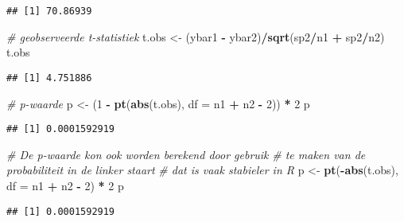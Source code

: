 \documentclass[12pt,dutch,coursenotes]{book}
\newenvironment{Shaded}{\begin{snugshade}}{\end{snugshade}}
\newcommand{\KeywordTok}[1]{\textcolor[rgb]{0.13,0.29,0.53}{\textbf{#1}}}
\newcommand{\DataTypeTok}[1]{\textcolor[rgb]{0.13,0.29,0.53}{#1}}
\newcommand{\DecValTok}[1]{\textcolor[rgb]{0.00,0.00,0.81}{#1}}
\newcommand{\StringTok}[1]{\textcolor[rgb]{0.31,0.60,0.02}{#1}}
\newcommand{\CommentTok}[1]{\textcolor[rgb]{0.56,0.35,0.01}{\textit{#1}}}
\newcommand{\OperatorTok}[1]{\textcolor[rgb]{0.81,0.36,0.00}{\textbf{#1}}}
\newcommand{\NormalTok}[1]{#1}
\theoremstyle{definition}
\theoremstyle{definition}
\theoremstyle{definition}
\theoremstyle{remark}
\begin{document}
\begin{verbatim}
## [1] 70.86939
\end{verbatim}

\begin{Shaded}
\begin{Highlighting}[]
\CommentTok{# geobserveerde t-statistiek}
\NormalTok{t.obs <-}\StringTok{ }\NormalTok{(ybar1 }\OperatorTok{-}\StringTok{ }\NormalTok{ybar2)}\OperatorTok{/}\KeywordTok{sqrt}\NormalTok{(sp2}\OperatorTok{/}\NormalTok{n1 }\OperatorTok{+}\StringTok{ }\NormalTok{sp2}\OperatorTok{/}\NormalTok{n2)}
\NormalTok{t.obs}
\end{Highlighting}
\end{Shaded}

\begin{verbatim}
## [1] 4.751886
\end{verbatim}

\begin{Shaded}
\begin{Highlighting}[]
\CommentTok{# p-waarde}
\NormalTok{p <-}\StringTok{ }\NormalTok{(}\DecValTok{1} \OperatorTok{-}\StringTok{ }\KeywordTok{pt}\NormalTok{(}\KeywordTok{abs}\NormalTok{(t.obs), }\DataTypeTok{df =}\NormalTok{ n1 }\OperatorTok{+}\StringTok{ }\NormalTok{n2 }\OperatorTok{-}\StringTok{ }\DecValTok{2}\NormalTok{)) }\OperatorTok{*}\StringTok{ }\DecValTok{2}
\NormalTok{p}
\end{Highlighting}
\end{Shaded}

\begin{verbatim}
## [1] 0.0001592919
\end{verbatim}

\begin{Shaded}
\begin{Highlighting}[]
\CommentTok{# De p-waarde kon ook worden berekend door gebruik}
\CommentTok{# te maken van de probabiliteit in de linker staart}
\CommentTok{# dat is vaak stabieler in R}
\NormalTok{p <-}\StringTok{ }\KeywordTok{pt}\NormalTok{(}\OperatorTok{-}\KeywordTok{abs}\NormalTok{(t.obs), }\DataTypeTok{df =}\NormalTok{ n1 }\OperatorTok{+}\StringTok{ }\NormalTok{n2 }\OperatorTok{-}\StringTok{ }\DecValTok{2}\NormalTok{) }\OperatorTok{*}\StringTok{ }\DecValTok{2}
\NormalTok{p}
\end{Highlighting}
\end{Shaded}

\begin{verbatim}
## [1] 0.0001592919
\end{verbatim}
\end{document}
